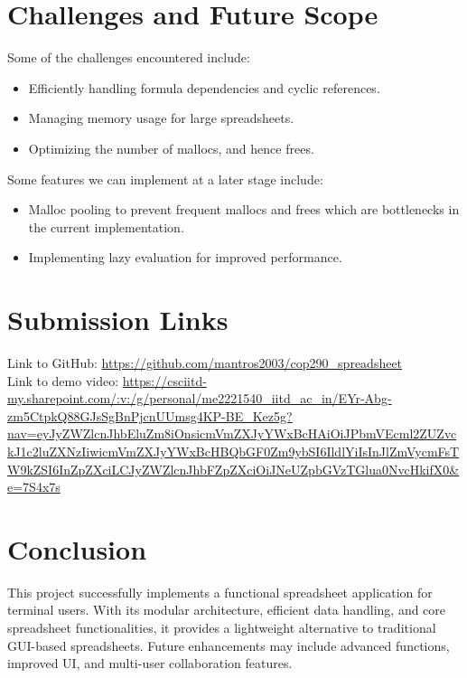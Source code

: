 \documentclass{article}
\begin{document}
\section{Challenges and Future Scope}
Some of the challenges encountered include:
\begin{itemize}
    \item Efficiently handling formula dependencies and cyclic references.
    \item Managing memory usage for large spreadsheets.
    \item Optimizing the number of mallocs, and hence frees.
\end{itemize}
Some features we can implement at a later stage include:
\begin{itemize}
    \item Malloc pooling to prevent frequent mallocs and frees which are bottlenecks in the current implementation.
    \item Implementing lazy evaluation for improved performance.
\end{itemize}

\section{Submission Links}
Link to GitHub: \url{https://github.com/mantros2003/cop290_spreadsheet}\\
Link to demo video: \url{https://csciitd-my.sharepoint.com/:v:/g/personal/me2221540_iitd_ac_in/EYr-Abg-zm5CtpkQ88GJsSgBnPjcnUUmsg4KP-BE_Kez5g?nav=eyJyZWZlcnJhbEluZm8iOnsicmVmZXJyYWxBcHAiOiJPbmVEcml2ZUZvckJ1c2luZXNzIiwicmVmZXJyYWxBcHBQbGF0Zm9ybSI6IldlYiIsInJlZmVycmFsTW9kZSI6InZpZXciLCJyZWZlcnJhbFZpZXciOiJNeUZpbGVzTGlua0NvcHkifX0&e=7S4x7s}

\section{Conclusion}
This project successfully implements a functional spreadsheet application for terminal users. With its modular architecture, efficient data handling, and core spreadsheet functionalities, it provides a lightweight alternative to traditional GUI-based spreadsheets. Future enhancements may include advanced functions, improved UI, and multi-user collaboration features.
\end{document}
